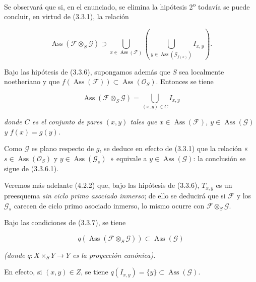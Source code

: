 Se observará que si, en el enunciado, se elimina la hipótesis
2\textsuperscript{o} todavía se puede concluir, en virtud de (3.3.1), la relación

\begin{env}[3.3.6.4]
\label{IV.2.3.3.6.4-fr}
\[
\operatorname{Ass}(\mathcal F\otimes_S\mathcal G)
\supset\bigcup_{x\in\operatorname{Ass}(\mathcal F)}
\left(\bigcup_{y\in\operatorname{Ass}(\mathcal G_{f(x)})}I_{x,y}\right).
\]
\end{env}

\begin{corollary}[3.3.7]
\label{IV.2.3.3.7-fr}
Bajo las hipótesis de \textup{(3.3.6)}, supongamos además que $S$ sea localmente
noetheriano y que
$f(\operatorname{Ass}(\mathcal F))\subset\operatorname{Ass}(\mathcal O_S)$.
Entonces se tiene
\end{corollary}

\begin{env}[3.3.7.1]
\label{IV.2.3.3.7.1-fr}
\[
\operatorname{Ass}(\mathcal F\otimes_S\mathcal G)
=\bigcup_{(x,y)\in C}I_{x,y}
\]
\end{env}

\textit{donde $C$ es el conjunto de pares $(x,y)$ tales que
$x\in\operatorname{Ass}(\mathcal F)$, $y\in\operatorname{Ass}(\mathcal G)$ y
$f(x)=g(y)$.}

Como $\mathcal G$ es plano respecto de $g$, se deduce en efecto de (3.3.1) que la relación
«~$s\in\operatorname{Ass}(\mathcal O_S)$ y
$y\in\operatorname{Ass}(\mathcal G_s)$~» equivale a
$y\in\operatorname{Ass}(\mathcal G)$: la conclusión se sigue de (3.3.6.1).

\begin{remarks}[3.3.8]
\label{IV.2.3.3.8-fr}
Veremos más adelante (4.2.2) que, bajo las hipótesis de (3.3.6),
$T_{x,y}$ es un preesquema \emph{sin ciclo primo asociado inmerso}; de ello se
deducirá que si $\mathcal F$ y los $\mathcal G_s$ carecen de ciclo primo
asociado inmerso, lo mismo ocurre con $\mathcal F\otimes_S\mathcal G$.
\end{remarks}

\begin{corollary}[3.3.9]
\label{IV.2.3.3.9-fr}
Bajo las condiciones de \textup{(3.3.7)}, se tiene
\end{corollary}

\begin{env}[3.3.9.1]
\label{IV.2.3.3.9.1-fr}
\[
q(\operatorname{Ass}(\mathcal F\otimes_S\mathcal G))
\subset\operatorname{Ass}(\mathcal G)
\]
\end{env}

\textit{(donde $q:X\times_S Y\to Y$ es la proyección canónica).}

En efecto, si $(x,y)\in Z$, se tiene
$q(I_{x,y})=\{y\}\subset\operatorname{Ass}(\mathcal G)$.
